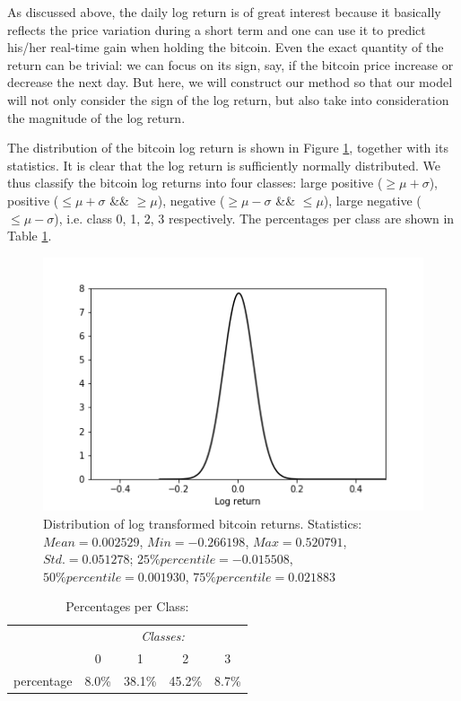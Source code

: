 \documentclass[9pt,twocolumn,twoside]{ilcss}
\begin{document}
As discussed above, the daily log return is of great interest because it basically reflects the price variation during a short term and one can use it to predict his/her real-time gain when holding the bitcoin. Even the exact quantity of the return can be trivial: we can focus on its sign, say, if the bitcoin price increase or decrease the next day. But here, we will construct our method so that our model will not only consider the sign of the log return, but also take into consideration the magnitude of the log return.

The distribution of the bitcoin log return is shown in Figure \ref{distribution_log_return}, together with its statistics. It is clear that the log return is sufficiently normally distributed. We thus classify the bitcoin log returns into four classes: large positive ($\geq \mu + \sigma$), positive ($\leq \mu + \sigma$ \&\& $\geq \mu$), negative ($\geq \mu - \sigma$ \&\& $\leq \mu$), large negative ($\leq \mu - \sigma$), i.e. class 0, 1, 2, 3 respectively. The percentages per class are shown in Table \ref{percent_per_class}.

\begin{figure}[h]
\centering
\includegraphics[width=.75\linewidth]{btc_ret_a.png}
\caption{Distribution of log transformed bitcoin returns. Statistics: $Mean = 0.002529$, $Min = -0.266198$, $Max = 0.520791$, $Std. = 0.051278$; $25\% percentile = -0.015508$, $50\% percentile = 0.001930$, $75\% percentile = 0.021883$}
\label{distribution_log_return}
\end{figure}

\begin{table}[h]
\centering
\caption{Percentages per Class:}
    \begin{tabular}{lcccc}
    \hline
    \hline
    & \multicolumn{4}{c}{\textit{Classes:}}\\
    \cline{2-5}
    & 0 & 1 & 2 & 3 \\
    \hline
    percentage & 8.0\% & 38.1\% & 45.2\% & 8.7\% \\
    \hline
    \end{tabular}
    \label{percent_per_class}
\end{table}
\end{document}

